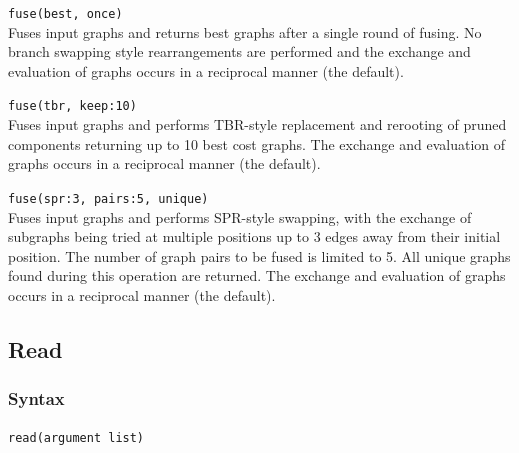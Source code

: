 	\begin{example}
	
		\item{\texttt{fuse(best, once)}\\Fuses input graphs and returns best graphs after a single 
		round of fusing. No branch swapping style rearrangements are performed and the exchange 
		and evaluation of graphs occurs in a reciprocal manner (the default).}
		
		\item{\texttt{fuse(tbr, keep:10)} \\Fuses input graphs and performs TBR-style replacement 
		and rerooting of pruned components returning up to 10 best cost graphs. The exchange 
		and evaluation of graphs occurs in a reciprocal manner (the default).}
		
		\item{\texttt{fuse(spr:3, pairs:5, unique)} \\Fuses input graphs and performs SPR-style swapping, 
		with the exchange of subgraphs being tried at multiple positions up to 3 edges away from their 
		initial position. The number of graph pairs to be fused is limited to 5. All unique graphs found
		during this operation are returned. The exchange and evaluation of graphs occurs in a reciprocal 
		manner (the default)}.
		
	\end{example}

	
\subsection{Read}
\label{subsec:read}
	\subsubsection{Syntax}
		\texttt{read(argument list)}
			
